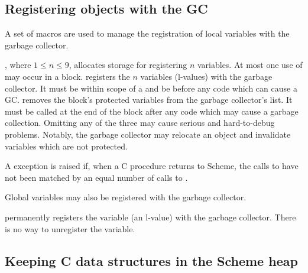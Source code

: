 \subsection{Registering objects with the GC}
\label{sec:gc-register}

A set of macros are used to manage the registration of local variables with the
 garbage collector.

\begin{protos}
\end{protos}

, where  $1\leq n\leq 9$, allocates
 storage for registering $n$ variables.
At most one use of  may occur in a
 block.
 registers the
 $n$ variables (l-values) with the garbage collector.
It must be within scope of a 
 and be before any code which can cause a GC.
 removes the block's protected variables from
 the garbage collector's list.
It must be called at the end of the block after 
  any code which may cause a garbage collection.
Omitting any of the three may cause serious and
 hard-to-debug problems.
Notably, the garbage collector may relocate an object and
 invalidate  variables which are not protected.

A  exception is raised if, when a C
 procedure returns to Scheme, the calls
 to  have not been matched by an equal number of
 calls to .

Global variables may also be registered with the garbage collector.

\begin{protos}
\end{protos}

\noindent{} permanently registers the
  variable  (an l-value) with the garbage collector.
There is no way to unregister the variable.

\subsection{Keeping C data structures in the Scheme heap}
\label{sec:external-data}

